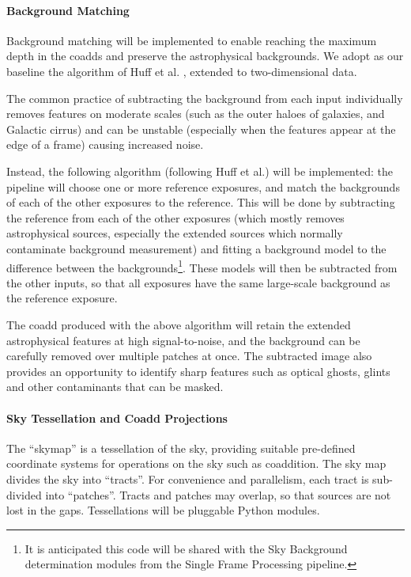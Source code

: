 \documentclass[12pt]{article}
\begin{document}
\paragraph{Background Matching}
\label{alg:backgroundMatching}

Background matching will be implemented to enable reaching the maximum depth in the coadds and preserve the astrophysical backgrounds.  We adopt as our baseline the algorithm of Huff et al. \cite{Huff11}, extended to two-dimensional data.

The common practice of subtracting the background from each input individually removes features on moderate scales (such as the outer haloes of galaxies, and Galactic cirrus) and can be unstable (especially when the features appear at the edge of a frame) causing increased noise.

Instead, the following algorithm (following Huff et al.) will be implemented: the pipeline will choose one or more reference exposures, and match the backgrounds of each of the other exposures to the reference.  This will be done by subtracting the reference from each of the other exposures (which mostly removes astrophysical sources, especially the extended sources which normally contaminate background measurement) and fitting a background model to the difference between the backgrounds\footnote{It is anticipated this code will be shared with the Sky Background determination modules from the Single Frame Processing pipeline.}. These models will then be subtracted from the other inputs, so that all exposures have the same large-scale background as the reference exposure. 

The coadd produced with the above algorithm will retain the extended astrophysical features at high signal-to-noise, and the background can be carefully removed over multiple patches at once. The subtracted image also provides an opportunity to identify sharp features such as optical ghosts, glints and other contaminants that can be masked.

\paragraph{Sky Tessellation and Coadd Projections\label{alg:skymap}}

The ``skymap'' is a tessellation of the sky, providing suitable pre-defined coordinate systems for operations on the sky such as coaddition.  The sky map divides the sky into ``tracts''.  For convenience and parallelism, each tract is sub-divided into ``patches''.  Tracts and patches may overlap, so that sources are not lost in the gaps. Tessellations will be pluggable Python modules.
\\
\end{document}
